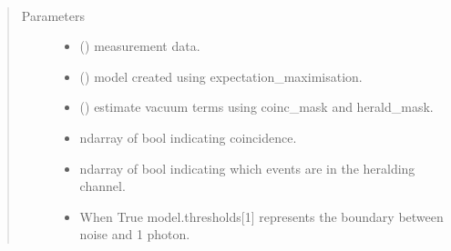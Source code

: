 \documentclass[letterpaper,10pt,english]{sphinxmanual}
\begin{document}

\begin{fulllineitems}
\label{\detokenize{tes:tes.analysis.count}}~\begin{quote}\begin{description}
\item[{Parameters}] \leavevmode\begin{itemize}
\item {} 
\sphinxAtStartPar
{} () \textendash{} measurement data.

\item {} 
\sphinxAtStartPar
{} ({\hyperref[\detokenize{tes:tes.analysis.MixtureModel}]{}}) \textendash{} model created using
expectation\_maximisation.

\item {} 
\sphinxAtStartPar
{} () \textendash{} estimate vacuum terms using coinc\_mask and herald\_mask.

\item {} 
\sphinxAtStartPar
{} \textendash{} ndarray of bool indicating coincidence.

\item {} 
\sphinxAtStartPar
{} \textendash{} ndarray of bool indicating which events are in the
heralding channel.

\item {} 
\sphinxAtStartPar
{} \textendash{} When True model.thresholds{[}1{]} represents the
boundary between noise and 1 photon.

\end{itemize}


\end{description}
\end{quote}
\end{fulllineitems}
\end{document}
